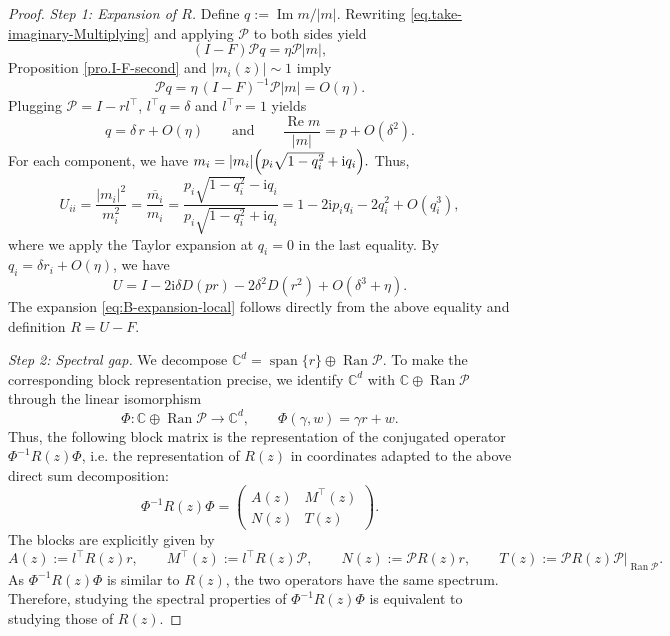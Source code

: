 \documentclass[11pt,twoside, a4paper]{article}
\numberwithin{equation}{section}
\numberwithin{figure}{section}
\theoremstyle{plain} %
\theoremstyle{definition}
\theoremstyle{remark}
\newcommand{\1} {\mspace{1 mu}}
\newcommand{\2} {\mspace{2 mu}}
\newcommand{\ii}{\mathrm{i}}
\DeclareMathOperator{\re}{Re}
\DeclareMathOperator{\im}{Im}
\begin{document}
\begin{proof}
\medskip
\emph{Step 1: Expansion of \(R\).}
Define $
q:=\im m/|m|.
$
Rewriting \eqref{eq.take-imaginary-Multiplying} and applying \(\mathcal{P}\) to both sides yield
\[
(I-F)\mathcal{P}q=\eta\mathcal{P}|m|,
\]
Proposition \ref{pro.I-F-second} and $|m_i(z)|\sim 1$ imply
\[
\mathcal{P}q=\eta\,(I-F)^{-1}\mathcal{P}|m|=O(\eta).
\]
Plugging $\mathcal{P}=I-rl^\top$, \(l^\top q=\delta\) and \(l^\top r=1\) yields
\[
q=\delta\, r+O(\eta)\qquad\text{and}\qquad \frac{\re m}{|m|}=p+O(\delta^2).
\]
For each component, we have
$
m_i
=
|m_i|\Bigl(p_i\sqrt{1-q_i^2}+\ii q_i\Bigr).
$
Thus, 
\[
U_{ii}=\frac{|m_i|^2}{m_i^2}
=
\frac{\overline{m_i}}{m_i}
=
\frac{p_i\sqrt{1-q_i^2}-\ii q_i}{p_i\sqrt{1-q_i^2}+\ii q_i}=1-2\ii p_i q_i-2q_i^2+O(q_i^3),
\]
where we apply the Taylor expansion at \(q_i=0\) in the last equality. 
By \(q_i=\delta r_i+O(\eta)\), we have
\begin{equation}\label{eq.U-expansion}
  U
=
I-2\ii\delta D(pr)-2\delta^2D(r^2)+O(\delta^3+\eta).
\end{equation}
The expansion \eqref{eq:B-expansion-local} follows directly from the above equality and definition $R=U-F$.


\medskip
\textit{Step 2: Spectral gap.}
We decompose $\mathbb C^d=\operatorname{span}\{r\}\oplus \operatorname{Ran}\mathcal P$. 
To make the corresponding block representation precise, we identify \(\mathbb C^d\) with \(\mathbb C\oplus \operatorname{Ran}\mathcal P\) through the linear isomorphism 
\[ \Phi:\mathbb C\oplus \operatorname{Ran}\mathcal P\to \mathbb C^d, \qquad \Phi(\gamma,w)=\gamma r+w . \] 
Thus, the following block matrix is the representation of the conjugated operator \(\Phi^{-1}R(z)\Phi\), i.e. the representation of \(R(z)\) in coordinates adapted to the above direct sum decomposition: 
\[ \Phi^{-1}R(z)\Phi = \begin{pmatrix} A(z) & M^\top(z) \\ N(z) & T(z) \end{pmatrix}. \] The blocks are explicitly given by \[ A(z):=l^\top R(z)r,\qquad M^\top(z):=l^\top R(z)\mathcal P,\qquad N(z):=\mathcal P R(z)r,\qquad T(z):=\mathcal P R(z)\mathcal P|_{\operatorname{Ran}\mathcal P}. \]
As \(\Phi^{-1}R(z)\Phi\) is similar to \(R(z)\), the two operators have the same spectrum. Therefore, studying the spectral properties of
\(\Phi^{-1}R(z)\Phi\) is equivalent to studying those of \(R(z)\).


\end{proof}
\end{document}
